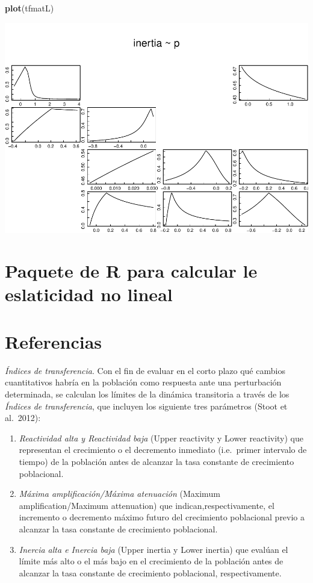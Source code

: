 \documentclass[
]{book}
\newenvironment{Shaded}{\begin{snugshade}}{\end{snugshade}}
\newcommand{\FunctionTok}[1]{\textcolor[rgb]{0.13,0.29,0.53}{\textbf{#1}}}
\newcommand{\NormalTok}[1]{#1}
\theoremstyle{definition}
\theoremstyle{definition}
\theoremstyle{definition}
\theoremstyle{definition}
\theoremstyle{remark}
\begin{document}
\begin{Shaded}
\begin{Highlighting}[]
\FunctionTok{plot}\NormalTok{(tfmatL)}
\end{Highlighting}
\end{Shaded}

\includegraphics{Diagnostico_Poblacional_files/figure-latex/unnamed-chunk-22-3.pdf}

\section{Paquete de R para calcular le eslaticidad no lineal}\label{paquete-de-r-para-calcular-le-eslaticidad-no-lineal}

\section{Referencias}\label{referencias-3}

\emph{Índices de transferencia}. Con el fin de evaluar en el corto plazo qué cambios cuantitativos habría en la población como respuesta ante una perturbación determinada, se calculan los límites de la dinámica transitoria a través de los \emph{Índices de transferencia}, que incluyen los siguiente tres parámetros (Stoot et al.~2012):

\begin{enumerate}
\def\labelenumi{\alph{enumi})}
\item
  \emph{Reactividad alta y Reactividad baja} (Upper reactivity y Lower reactivity) que representan el crecimiento o el decremento inmediato (i.e.~primer intervalo de tiempo) de la población antes de alcanzar la tasa constante de crecimiento poblacional.
\item
  \emph{Máxima amplificación/Máxima atenuación} (Maximum amplification/Maximum attenuation) que indican,respectivamente, el incremento o decremento máximo futuro del crecimiento poblacional previo a alcanzar la tasa constante de crecimiento poblacional.
\item
  \emph{Inercia alta e Inercia baja} (Upper inertia y Lower inertia) que evalúan el límite más alto o el más bajo en el crecimiento de la población antes de alcanzar la tasa constante de crecimiento poblacional, respectivamente.
\end{enumerate}
\end{document}
